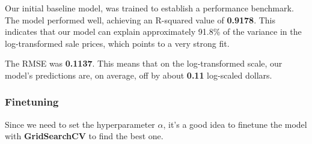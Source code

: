 \documentclass[11pt]{article}
\begin{document}
    Our initial baseline model, was trained to establish a performance
benchmark. The model performed well, achieving an R-squared value of
\textbf{0.9178}. This indicates that our model can explain approximately
91.8\% of the variance in the log-transformed sale prices, which points
to a very strong fit.

The RMSE was \textbf{0.1137}. This means that on the log-transformed
scale, our model's predictions are, on average, off by about
\textbf{0.11} log-scaled dollars.

    \subsubsection{Finetuning}\label{finetuning}

    Since we need to set the hyperparameter \(\alpha\), it's a good idea to
finetune the model with \textbf{GridSearchCV} to find the best one.
\end{document}
